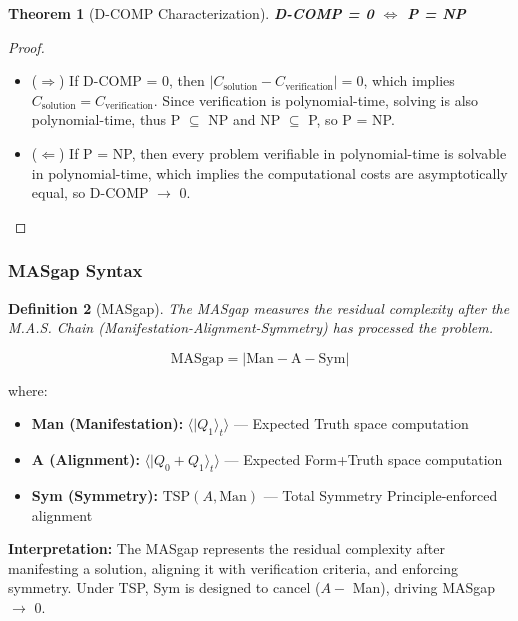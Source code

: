 \documentclass[11pt, letterpaper]{article}
\newtheorem{theorem}{Theorem}[section]
\newtheorem{definition}[theorem]{Definition}
\begin{document}
\begin{theorem}[D-COMP Characterization]
\textbf{D-COMP = 0 $\iff$ P = NP}
\end{theorem}

\begin{proof}
\begin{itemize}
    \item ($\Rightarrow$) If D-COMP = 0, then $|C_{\text{solution}} - C_{\text{verification}}| = 0$, which implies $C_{\text{solution}} = C_{\text{verification}}$. Since verification is polynomial-time, solving is also polynomial-time, thus P $\subseteq$ NP and NP $\subseteq$ P, so P = NP.
    \item ($\Leftarrow$) If P = NP, then every problem verifiable in polynomial-time is solvable in polynomial-time, which implies the computational costs are asymptotically equal, so D-COMP $\to$ 0.
\end{itemize}
\end{proof}

\subsubsection{MASgap Syntax}

\begin{definition}[MASgap]
The MASgap measures the residual complexity after the M.A.S. Chain (Manifestation-Alignment-Symmetry) has processed the problem.

\begin{equation}
\text{MASgap} = |\text{Man} - \text{A} - \text{Sym}|
\end{equation}
\end{definition}
where:
\begin{itemize}
    \item \textbf{Man (Manifestation):} $\langle |Q_1\rangle_t \rangle$ — Expected Truth space computation
    \item \textbf{A (Alignment):} $\langle |Q_0 + Q_1\rangle_t \rangle$ — Expected Form+Truth space computation
    \item \textbf{Sym (Symmetry):} $\text{TSP}(A, \text{Man})$ — Total Symmetry Principle-enforced alignment
\end{itemize}

\textbf{Interpretation:} The MASgap represents the residual complexity after manifesting a solution, aligning it with verification criteria, and enforcing symmetry. Under TSP, Sym is designed to cancel ($A -$ Man), driving MASgap $\to$ 0.
\end{document}
